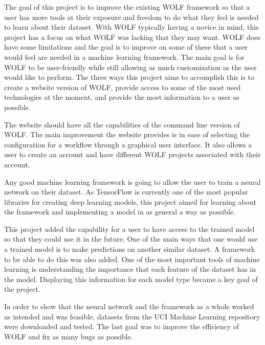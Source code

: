 The goal of this project is to improve the existing WOLF framework so that a user has more tools at their exposure and freedom to do what they feel is needed to learn about their dataset. With WOLF typically having a novice in mind, this project has a focus on what WOLF was lacking that they may want. WOLF does have some limitations and the goal is to improve on some of these that a user would feel are needed in a machine learning framework. The main goal is for WOLF to be user-friendly while still allowing as much customization as the user would like to perform. The three ways this project aims to accomplish this is to create a website version of WOLF, provide access to some of the most used technologies at the moment, and provide the most information to a user as possible. 

The website should have all the capabilities of the command line version of WOLF. The main improvement the website provides is in ease of selecting the configuration for a workflow through a graphical user interface. It also allows a user to create an account and have different WOLF projects associated with their account.

Any good machine learning framework is going to allow the user to train a neural network on their dataset. As TensorFlow is currently one of the most popular libraries for creating deep learning models, this project aimed for learning about the framework and implementing a model in as general a way as possible. 

This project added the capability for a user to have access to the trained model so that they could use it in the future. One of the main ways that one would use a trained model is to make predictions on another similar dataset. A framework to be able to do this was also added. One of the most important tools of machine learning is understanding the importance that each feature of the dataset has in the model. Displaying this information for each model type became a key goal of the project.

In order to show that the neural network and the framework as a whole worked as intended and was feasible, datasets from the UCI Machine Learning repository \parencite{UCIdata} were downloaded and tested. The last goal was to improve the efficiency of WOLF and fix as many bugs as possible.